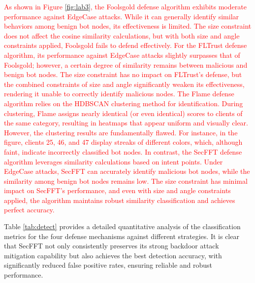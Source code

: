 \documentclass[lettersize,journal]{IEEEtran}
\begin{document}
\textcolor{red}{As shown in Figure \ref{fig:lab3}, the Foolsgold defense algorithm exhibits moderate performance against EdgeCase attacks. While it can generally identify similar behaviors among benign bot nodes, its effectiveness is limited. The size constraint does not affect the cosine similarity calculations, but with both size and angle constraints applied, Foolsgold fails to defend effectively. For the FLTrust defense algorithm, its performance against EdgeCase attacks slightly surpasses that of Foolsgold; however, a certain degree of similarity remains between malicious and benign bot nodes. The size constraint has no impact on FLTrust's defense, but the combined constraints of size and angle significantly weaken its effectiveness, rendering it unable to correctly identify malicious nodes. The Flame defense algorithm relies on the HDBSCAN clustering method for identification. During clustering, Flame assigns nearly identical (or even identical) scores to clients of the same category, resulting in heatmaps that appear uniform and visually clear. However, the clustering results are fundamentally flawed. For instance, in the figure, clients 25, 46, and 47 display streaks of different colors, which, although faint, indicate incorrectly classified bot nodes. In contrast, the SecFFT defense algorithm leverages similarity calculations based on intent points. Under EdgeCase attacks, SecFFT can accurately identify malicious bot nodes, while the similarity among benign bot nodes remains low. The size constraint has minimal impact on SecFFT's performance, and even with size and angle constraints applied, the algorithm maintains robust similarity classification and achieves perfect accuracy.}

Table \ref{tab:detect} provides a detailed quantitative analysis of the classification metrics for the four defense mechanisms against different strategies. It is clear that SecFFT not only consistently preserves its strong backdoor attack mitigation capability but also achieves the best detection accuracy, with significantly reduced false positive rates, ensuring reliable and robust performance.

\end{document}
